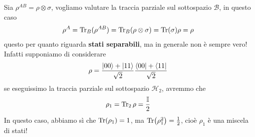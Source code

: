 \begin{esempio}
Sia $\rho^{AB}=\rho \otimes \sigma$, vogliamo valutare la traccia parziale sul sottospazio $\mathcal{B}$, in questo caso
\begin{equation*}
    \rho^A = \Tr_B(\rho^{AB})=\Tr_B(\rho \otimes \sigma)=\Tr(\sigma)\rho = \rho
\end{equation*}
questo per quanto riguarda \textbf{stati separabili}, ma in generale non è sempre vero! Infatti supponiamo di considerare
\begin{equation*}
    \rho = \frac{\ket{00}+\ket{11}}{\sqrt 2}\frac{\bra{00}+\bra{11}}{\sqrt 2}
\end{equation*}
se eseguissimo la traccia parziale sul sottospazio $\mathcal{H}_2$, avremmo che
\begin{equation*}
    \rho_1 = \Tr_2\rho = \frac{\mathbb{I}}{2}
\end{equation*}
In questo caso, abbiamo sì che $\Tr (\rho_1)=1$, ma $\Tr(\rho_1^2)=\frac 12$, cioè $\rho_1$ è una miscela di stati!
\end{esempio}